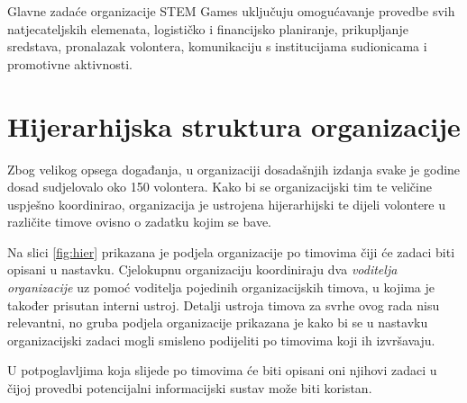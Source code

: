 \documentclass[times, utf8, diplomski]{fer}
\begin{document}
Glavne zadaće organizacije STEM Games uključuju omogućavanje provedbe svih
natjecateljskih elemenata, logističko i financijsko planiranje, prikupljanje
sredstava, pronalazak volontera, komunikaciju s institucijama sudionicama i
promotivne aktivnosti.

\section{Hijerarhijska struktura organizacije} \label{structure}

Zbog velikog opsega događanja, u organizaciji dosadašnjih izdanja svake je
godine dosad sudjelovalo oko 150 volontera. Kako bi se organizacijski tim te
veličine uspješno koordinirao, organizacija je ustrojena hijerarhijski te dijeli
volontere u različite timove ovisno o zadatku kojim se bave.

Na slici \ref{fig:hier} prikazana je podjela organizacije po timovima čiji će
zadaci biti opisani u nastavku. Cjelokupnu organizaciju koordiniraju dva
\emph{voditelja organizacije} uz pomoć voditelja pojedinih organizacijskih
timova, u kojima je također prisutan interni ustroj. Detalji ustroja timova za
svrhe ovog rada nisu relevantni, no gruba podjela organizacije prikazana je kako
bi se u nastavku organizacijski zadaci mogli smisleno podijeliti po timovima
koji ih izvršavaju.

U potpoglavljima koja slijede po timovima će biti opisani oni njihovi zadaci u
čijoj provedbi potencijalni informacijski sustav može biti koristan.
\end{document}

